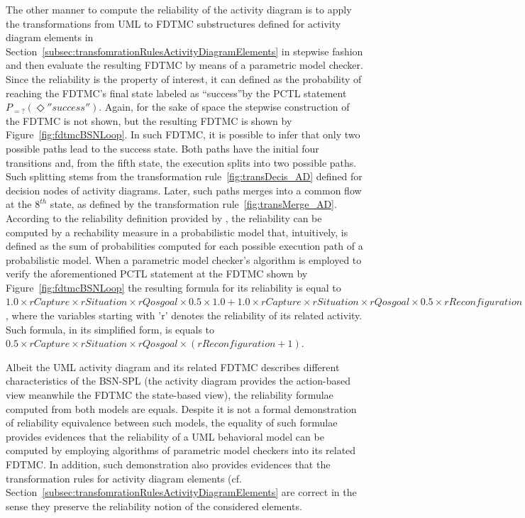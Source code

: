 The other manner to compute the reliability of the activity diagram is to apply
the transformations from UML to FDTMC substructures defined for activity
diagram elements in Section~\ref{subsec:transfomrationRulesActivityDiagramElements} in
stepwise fashion and then evaluate the resulting FDTMC by means of a parametric
model checker. Since the reliability is the property of interest, it can
defined as the probability of reaching the FDTMC's final state labeled as
``success''by the PCTL statement $P_{=?}(\Diamond ''success'')$. Again, for the
sake of space the stepwise construction of the FDTMC is not shown, but the
resulting FDTMC is shown by Figure~\ref{fig:fdtmcBSNLoop}. In such FDTMC, it is
possible to infer that only two possible paths lead to the success state. Both
paths have the initial four transitions and, from the fifth state, the
execution splits into two possible paths. Such splitting stems from the
transformation rule~\ref{fig:transDecis_AD} defined for decision nodes of
activity diagrams. Later, such paths merges into a common flow at the $8^{th}$
state, as defined by the transformation rule~\ref{fig:transMerge_AD}. According
to the reliability definition provided by \citet{grunske_specification_2008},
the reliability can be computed by a rechability measure in a probabilistic
model that, intuitively, is defined as the sum of probabilities computed for
each possible execution path of a probabilistic
model\cite{baier_principles_2008}. When a parametric model checker's
algorithm\cite{daws_pmc} is employed to verify the aforementioned PCTL
statement at the FDTMC shown by Figure~\ref{fig:fdtmcBSNLoop} the resulting
formula for its reliability is equal to $1.0 \times rCapture \times
rSituation \times rQosgoal \times 0.5 \times 1.0 + 1.0 \times rCapture
\times rSituation \times rQosgoal \times 0.5 \times rReconfiguration \times
1.0 \times 1.0 $, where the variables starting with 'r' denotes the reliability
of its related activity. Such formula, in its simplified form, is equals to
$0.5 \times rCapture \times rSituation \times rQosgoal \times (rReconfiguration
+ 1)$.

Albeit the UML activity diagram and its related FDTMC describes different
characteristics of the BSN-SPL (the activity diagram provides the action-based
view meanwhile the FDTMC the state-based view), the reliability formulae
computed from both models are equals. Despite it is not a formal demonstration
of reliability equivalence between such models, the equality of such formulae
provides evidences that the reliability of a UML behavioral model can be
computed by employing algorithms of parametric model checkers into its related
FDTMC. In addition, such demonstration also provides evidences that the
transformation rules for activity diagram elements (cf.
Section~\ref{subsec:transfomrationRulesActivityDiagramElements} are correct in
the sense they preserve the reliability notion of the considered elements.



